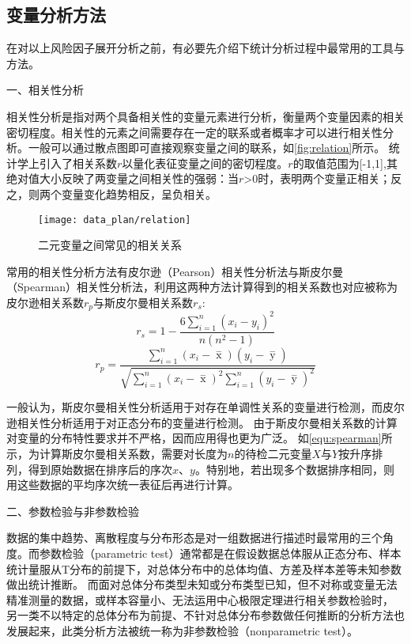 \subsection{变量分析方法}
在对以上风险因子展开分析之前，有必要先介绍下统计分析过程中最常用的工具与方法。

一、相关性分析

相关性分析是指对两个具备相关性的变量元素进行分析，衡量两个变量因素的相关密切程度\cite{Zhang2019}。相关性的元素之间需要存在一定的联系或者概率才可以进行相关性分析。一般可以通过散点图即可直接观察变量之间的联系，如\autoref{fig:relation}所示。
统计学上引入了相关系数$r$以量化表征变量之间的密切程度。$r$的取值范围为[-1,1],其绝对值大小反映了两变量之间相关性的强弱：当$r$>0时，表明两个变量正相关；反之，则两个变量变化趋势相反，呈负相关。

\begin{figure}[htbp]
      \centering
      \texttt{[image: data\_plan/relation]}
      \caption[二元变量之间常见的相关关系]{\label{fig:relation}二元变量之间常见的相关关系\cite{IXL2022}}
\end{figure}

常用的相关性分析方法有皮尔逊（Pearson）相关性分析法与斯皮尔曼（Spearman）相关性分析法，利用这两种方法计算得到的相关系数也对应被称为皮尔逊相关系数$r_p$与斯皮尔曼相关系数$r_s$:
\begin{equation}
      \label{equ:spearman}
      r_s=1-\frac{6\sum_{i=1}^{n}(x_{i}-y_{i})^2}{n(n^2-1)}
\end{equation}
\begin{equation}
      \label{equ:pearson}
      r_p=\frac{\sum_{i=1}^n{(x_i- \mathop{x} \limits^-)(y_i- \mathop{y} \limits^-)}}{\sqrt{{\sum_{i=1}^n}{{(x_i- \mathop{x} \limits^-)^2\sum_{i=1}^n}{(y_i- \mathop{y} \limits^-)^2}}}}
\end{equation}

一般认为，斯皮尔曼相关性分析适用于对存在单调性关系的变量进行检测，而皮尔逊相关性分析适用于对正态分布的变量进行检测。
由于斯皮尔曼相关系数的计算对变量的分布特性要求并不严格，因而应用得也更为广泛。
如\autoref{equ:spearman}所示，为计算斯皮尔曼相关系数，需要对长度为$n$的待检二元变量$X$与$Y$按升序排列，得到原始数据在排序后的序次$x$、$y$。特别地，若出现多个数据排序相同，则用这些数据的平均序次统一表征后再进行计算。

二、参数检验与非参数检验

数据的集中趋势、离散程度与分布形态是对一组数据进行描述时最常用的三个角度\cite{Hu2021}。而参数检验（parametric test）通常都是在假设数据总体服从正态分布、样本统计量服从T分布的前提下，对总体分布中的总体均值、方差及样本差等未知参数做出统计推断。
而面对总体分布类型未知或分布类型已知，但不对称或变量无法精准测量的数据，或样本容量小、无法运用中心极限定理进行相关参数检验时，
另一类不以特定的总体分布为前提、不针对总体分布参数做任何推断的分析方法也发展起来，此类分析方法被统一称为非参数检验（nonparametric test）\cite{Guo2017,Hu2021,Zhang2019}。

